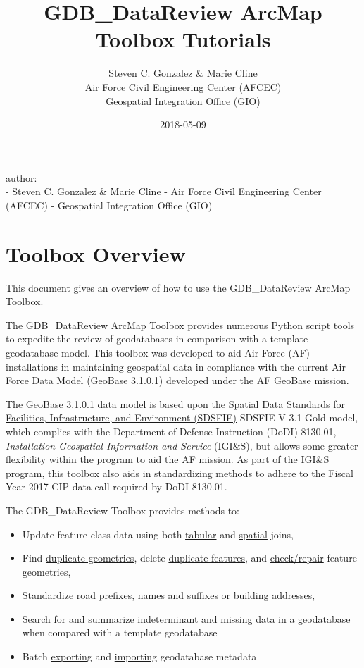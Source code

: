 \documentclass[openany]{book}
\title{GDB\_DataReview ArcMap Toolbox Tutorials}
\author{Steven C. Gonzalez \& Marie Cline \\ Air Force Civil Engineering Center (AFCEC) \\ Geospatial Integration Office (GIO)}
\date{2018-05-09}
\providecommand{\tightlist}{%
  \setlength{\itemsep}{0pt}\setlength{\parskip}{0pt}}
\theoremstyle{definition}
\theoremstyle{definition}
\theoremstyle{definition}
\theoremstyle{remark}
\begin{document}
\maketitle

{
\setcounter{tocdepth}{0}
\tableofcontents
}
\mainmatter
author:\\
- Steven C. Gonzalez \& Marie Cline - Air Force Civil Engineering Center
(AFCEC) - Geospatial Integration Office (GIO)

\chapter{Toolbox Overview}\label{overview}

This document gives an overview of how to use the GDB\_DataReview ArcMap
Toolbox.

The GDB\_DataReview ArcMap Toolbox provides numerous Python script tools
to expedite the review of geodatabases in comparison with a template
geodatabase model. This toolbox was developed to aid Air Force (AF)
installations in maintaining geospatial data in compliance with the
current Air Force Data Model (GeoBase 3.1.0.1) developed under the
\href{https://www.sdsfieonline.org/Components/USAF}{AF GeoBase mission}.

The GeoBase 3.1.0.1 data model is based upon the
\href{https://www.sdsfieonline.org/}{Spatial Data Standards for
Facilities, Infrastructure, and Environment (SDSFIE)} SDSFIE-V 3.1 Gold
model, which complies with the Department of Defense Instruction (DoDI)
8130.01, \emph{Installation Geospatial Information and Service}
(IGI\&S), but allows some greater flexibility within the program to aid
the AF mission. As part of the IGI\&S program, this toolbox also aids in
standardizing methods to adhere to the Fiscal Year 2017 CIP data call
required by DoDI 8130.01.

The GDB\_DataReview Toolbox provides methods to:

\begin{itemize}
\tightlist
\item
  Update feature class data using both
  \protect\hyperlink{joinCalc}{tabular} and
  \protect\hyperlink{spatjoinCalc}{spatial} joins,
\item
  Find \protect\hyperlink{dupGeom}{duplicate geometries}, delete
  \protect\hyperlink{dupFeats}{duplicate features}, and
  \protect\hyperlink{chkGeom}{check/repair} feature geometries,
\item
  Standardize \protect\hyperlink{std3}{road prefixes, names and
  suffixes} or \protect\hyperlink{stdAdd1}{building addresses},
\item
  \protect\hyperlink{indtSearch}{Search for} and
  \protect\hyperlink{summIndt}{summarize} indeterminant and missing data
  in a geodatabase when compared with a template geodatabase
\item
  Batch \protect\hyperlink{exMeta}{exporting} and
  \protect\hyperlink{imMeta}{importing} geodatabase metadata
\end{itemize}
\end{document}
